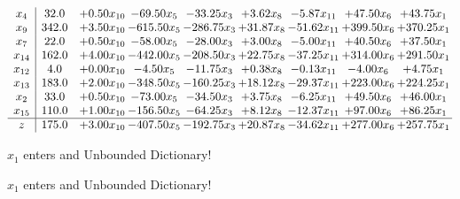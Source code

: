\documentclass[9pt]{article}
\begin{document}
 \[\begin{array}{c| c c@{\hskip 2pt} c@{\hskip 2pt} c@{\hskip 2pt} c@{\hskip 2pt} c@{\hskip 2pt} c@{\hskip 2pt} c@{\hskip 2pt} }
 x_{4}   &  32.0 & +  0.50 x_{10} & -69.50 x_{5} & -33.25 x_{3} & +  3.62 x_{8} & -5.87 x_{11} & + 47.50 x_{6} & + 43.75 x_{1}\\
 x_{9}   &  342.0 & +  3.50 x_{10} & -615.50 x_{5} & -286.75 x_{3} & + 31.87 x_{8} & -51.62 x_{11} & + 399.50 x_{6} & + 370.25 x_{1}\\
 x_{7}   &  22.0 & +  0.50 x_{10} & -58.00 x_{5} & -28.00 x_{3} & +  3.00 x_{8} & -5.00 x_{11} & + 40.50 x_{6} & + 37.50 x_{1}\\
 x_{14}   &  162.0 & +  4.00 x_{10} & -442.00 x_{5} & -208.50 x_{3} & + 22.75 x_{8} & -37.25 x_{11} & + 314.00 x_{6} & + 291.50 x_{1}\\
 x_{12}   &  4.0 & +  0.00 x_{10} & -4.50 x_{5} & -11.75 x_{3} & +  0.38 x_{8} & -0.13 x_{11} & -4.00 x_{6} & +  4.75 x_{1}\\
 x_{13}   &  183.0 & +  2.00 x_{10} & -348.50 x_{5} & -160.25 x_{3} & + 18.12 x_{8} & -29.37 x_{11} & + 223.00 x_{6} & + 224.25 x_{1}\\
 x_{2}   &  33.0 & +  0.50 x_{10} & -73.00 x_{5} & -34.50 x_{3} & +  3.75 x_{8} & -6.25 x_{11} & + 49.50 x_{6} & + 46.00 x_{1}\\
 x_{15}   &  110.0 & +  1.00 x_{10} & -156.50 x_{5} & -64.25 x_{3} & +  8.12 x_{8} & -12.37 x_{11} & + 97.00 x_{6} & + 86.25 x_{1}\\
\hline
z    &  175.0 & +  3.00 x_{10} & -407.50 x_{5} & -192.75 x_{3} & + 20.87 x_{8} & -34.62 x_{11} & + 277.00 x_{6} & + 257.75 x_{1}\\
\end{array}\]


 $ x_{1} $ enters and Unbounded Dictionary!


 $ x_{1} $ enters and Unbounded Dictionary!
\end{document}
